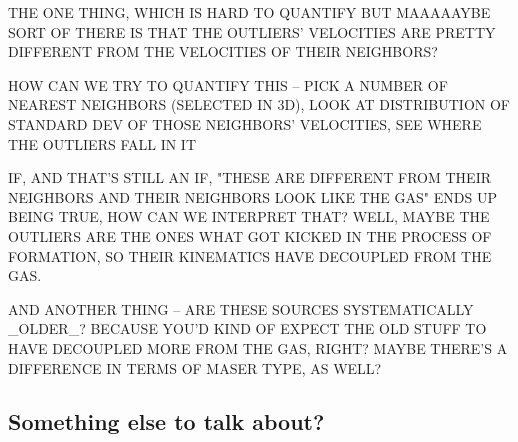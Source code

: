 THE ONE THING, WHICH IS HARD TO QUANTIFY BUT MAAAAAYBE SORT OF THERE IS THAT THE OUTLIERS' VELOCITIES ARE PRETTY DIFFERENT FROM THE VELOCITIES OF THEIR NEIGHBORS? 

HOW CAN WE TRY TO QUANTIFY THIS -- PICK A NUMBER OF NEAREST NEIGHBORS (SELECTED IN 3D), LOOK AT DISTRIBUTION OF STANDARD DEV OF THOSE NEIGHBORS' VELOCITIES, SEE WHERE THE OUTLIERS FALL IN IT

IF, AND THAT'S STILL AN IF, "THESE ARE DIFFERENT FROM THEIR NEIGHBORS AND THEIR NEIGHBORS LOOK LIKE THE GAS" ENDS UP BEING TRUE, HOW CAN WE INTERPRET THAT? WELL, MAYBE THE OUTLIERS ARE THE ONES WHAT GOT KICKED IN THE PROCESS OF FORMATION, SO THEIR KINEMATICS HAVE DECOUPLED FROM THE GAS.

AND ANOTHER THING -- ARE THESE SOURCES SYSTEMATICALLY _OLDER_? BECAUSE YOU'D KIND OF EXPECT THE OLD STUFF TO HAVE DECOUPLED MORE FROM THE GAS, RIGHT? MAYBE THERE'S A DIFFERENCE IN TERMS OF MASER TYPE, AS WELL?

\subsection{Something else to talk about?}
